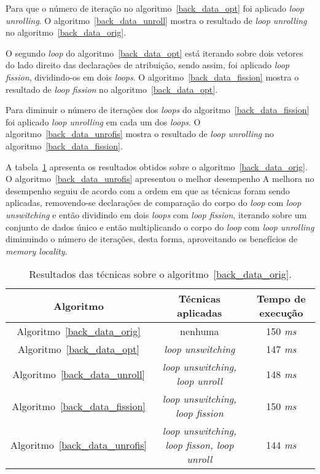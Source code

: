 Para que o número de iteração no algoritmo~\ref{back_data_opt} foi
aplicado \textit{loop unrolling}. O algoritmo~\ref{back_data_unroll} mostra o
resultado de \textit{loop unrolling} no algoritmo~\ref{back_data_orig}.

O segundo \textit{loop} do algoritmo~\ref{back_data_opt} está iterando sobre dois
vetores do lado direito das declarações de atribuição, sendo assim, foi
aplicado \textit{loop fission}, dividindo-os em dois \textit{loops}.
O algoritmo~\ref{back_data_fission} mostra o resultado de \textit{loop fission}
no algoritmo~\ref{back_data_opt}.

Para diminuir o número de iterações dos \textit{loops} do
algoritmo~\ref{back_data_fission} foi aplicado \textit{loop unrolling} em cada um
dos \textit{loops}. O algoritmo~\ref{back_data_unrofis} mostra o resultado de
\textit{loop unrolling} no algoritmo~\ref{back_data_fission}.


A tabela~\ref{tabela_back_data} apresenta os resultados obtidos sobre o
algoritmo~\ref{back_data_orig}.
O algoritmo~\ref{back_data_unrofis} apresentou o melhor desempenho 
A melhora no
desempenho seguiu de acordo com a ordem em que as técnicas foram sendo aplicadas, 
removendo-se
declarações de comparação do corpo do \textit{loop} com \textit{loop
unswitching} e então dividindo em dois
\textit{loops} com \textit{loop fission}, iterando sobre um conjunto de dados único 
e então multiplicando o
corpo do \textit{loop} com \textit{loop unrolling} diminuindo o número de iterações, 
desta forma, aproveitando os benefícios de \textit{memory locality}.

\begin{table}[ht]
  \label{tabela_back_data}
\begin{center}
  \begin{tabular}{|c|c|c|}
    \hline
    \textbf{Algoritmo} & \textbf{Técnicas aplicadas} & \textbf{Tempo de execução}\\
    \hline
    Algoritmo~\ref{back_data_orig} & nenhuma & 150 \textit{ms} \\
    \hline
    Algoritmo~\ref{back_data_opt} & \textit{loop unswitching} & 147 \textit{ms} \\
    \hline
    Algoritmo~\ref{back_data_unroll} & \textit{loop unswitching, loop unroll} & 148 \textit{ms} \\
    \hline
    Algoritmo~\ref{back_data_fission} & \textit{loop unswitching, loop fission} & 150 \textit{ms} \\
    \hline
    Algoritmo~\ref{back_data_unrofis} & \textit{loop unswitching, loop fisson, loop unroll} & 144 \textit{ms} \\
    \hline
  \end{tabular}
  \caption{Resultados das técnicas sobre o algoritmo~\ref{back_data_orig}.}
\end{center}
\end{table}




